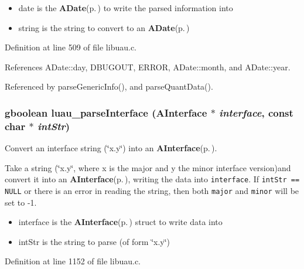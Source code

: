 \begin{itemize}
\item date is the {\bf ADate}{\rm (p.\,\pageref{structADate})} to write the parsed information into \item string is the string to convert to an {\bf ADate}{\rm (p.\,\pageref{structADate})} 
\end{itemize}


Definition at line 509 of file libuau.c.

References ADate::day, DBUGOUT, ERROR, ADate::month, and ADate::year.

Referenced by parse\-Generic\-Info(), and parse\-Quant\-Data().
\subsubsection{\setlength{\rightskip}{0pt plus 5cm}gboolean luau\_\-parse\-Interface ({\bf AInterface} $\ast$ {\em interface}, const char $\ast$ {\em int\-Str})}\label{libuau_8h_a71}


Convert an interface string (\char`\"{}x.y\char`\"{}) into an {\bf AInterface}{\rm (p.\,\pageref{structAInterface})}. 

Take a string (\char`\"{}x.y\char`\"{}, where x is the major and y the minor interface version)and convert it into an {\bf AInterface}{\rm (p.\,\pageref{structAInterface})}, writing the data into {\tt interface}. If {\tt int\-Str == NULL} or there is an error in reading the string, then both {\tt major} and {\tt minor} will be set to -1.

\begin{itemize}
\item interface is the {\bf AInterface}{\rm (p.\,\pageref{structAInterface})} struct to write data into \item int\-Str is the string to parse (of form \char`\"{}x.y\char`\"{}) 
\end{itemize}


Definition at line 1152 of file libuau.c.

